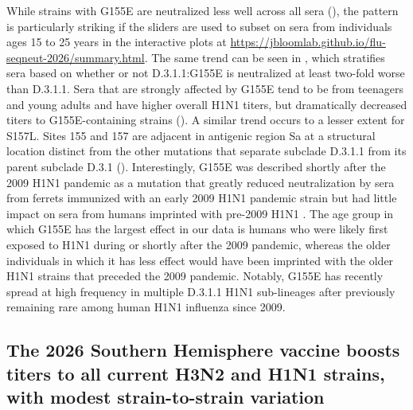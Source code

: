 While strains with G155E are neutralized less well across all sera (\textbf{}), the pattern is particularly striking if the sliders are used to subset on sera from individuals ages 15 to 25 years in the interactive plots at \href{https://jbloomlab.github.io/flu-seqneut-2026/summary.html}{https://jbloomlab.github.io/flu-seqneut-2026/summary.html}. The same trend can be seen in \textbf{}, which stratifies sera based on whether or not D.3.1.1:G155E is neutralized at least two-fold worse than D.3.1.1. Sera that are strongly affected by G155E tend to be from teenagers and young adults and have higher overall H1N1 titers, but dramatically decreased titers to G155E-containing strains (\textbf{}). A similar trend occurs to a lesser extent for S157L. Sites 155 and 157 are adjacent in antigenic region Sa at a structural location distinct from the other mutations that separate subclade D.3.1.1 from its parent subclade D.3.1 (\textbf{}). Interestingly, G155E was described shortly after the 2009 H1N1 pandemic as a mutation that greatly reduced neutralization by sera from ferrets immunized with an early 2009 H1N1 pandemic strain but had little impact on sera from humans imprinted with pre-2009 H1N1 \citep[][note G155E is G158E in H3 numbering]{li2013immune,chen2010}.
The age group in which G155E has the largest effect in our data is humans who were likely first exposed to H1N1 during or shortly after the 2009 pandemic, whereas the older individuals in which it has less effect would have been imprinted with the older H1N1 strains that preceded the 2009 pandemic.
Notably, G155E has recently spread at high frequency in multiple D.3.1.1 H1N1 sub-lineages after previously remaining rare among human H1N1 influenza since 2009.

\subsection{The 2026 Southern Hemisphere vaccine boosts titers to all current H3N2 and H1N1 strains, with modest strain-to-strain variation}

